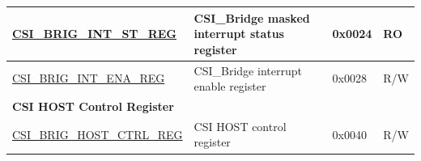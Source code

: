 \begin{longtable}{ | p{6cm} | p{7.2cm} | p{1.3cm} | p{1cm} | }
\hyperref[regdesc:CSIBRIGINTSTREG]{CSI\_BRIG\_INT\_ST\_REG} & CSI\_Bridge masked interrupt status register & 0x0024 & RO \\ \hline
\hyperref[regdesc:CSIBRIGINTENAREG]{CSI\_BRIG\_INT\_ENA\_REG} & CSI\_Bridge interrupt enable register & 0x0028 & R/W \\ \hline
\multicolumn{4}{|l|}{\textbf{CSI HOST Control Register}} \\ \hline
\hyperref[regdesc:CSIBRIGHOSTCTRLREG]{CSI\_BRIG\_HOST\_CTRL\_REG} & CSI HOST control register & 0x0040 & R/W \\ \hline
\end{longtable}
